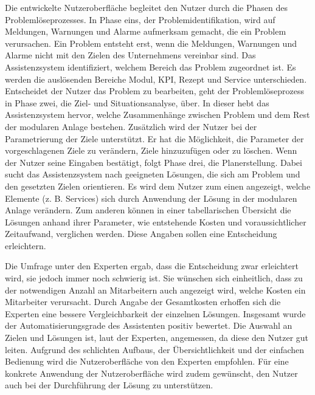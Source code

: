 Die entwickelte Nutzeroberfläche begleitet den Nutzer durch die Phasen des Problemlöseprozesses. In Phase eins, der Problemidentifikation, wird auf Meldungen, Warnungen und Alarme aufmerksam gemacht, die ein Problem verursachen. Ein Problem entsteht erst, wenn die Meldungen, Warnungen und Alarme nicht mit den Zielen des Unternehmens vereinbar sind. Das Assistenzsystem identifiziert, welchem Bereich das Problem zugeordnet ist. Es werden die auslösenden Bereiche Modul, KPI, Rezept und Service unterschieden. Entscheidet der Nutzer das Problem zu bearbeiten, geht der Problemlöseprozess in Phase zwei, die Ziel- und Situationsanalyse, über. In dieser hebt das Assistenzsystem hervor, welche Zusammenhänge zwischen Problem und dem Rest der modularen Anlage bestehen. Zusätzlich wird der Nutzer bei der Parametrierung der Ziele unterstützt. Er hat die Möglichkeit, die Parameter der vorgeschlagenen Ziele zu verändern, Ziele hinzuzufügen oder zu löschen. Wenn der Nutzer seine Eingaben bestätigt, folgt Phase drei, die Planerstellung. Dabei sucht das Assistenzsystem nach geeigneten Lösungen, die sich am Problem und den gesetzten Zielen orientieren. Es wird dem Nutzer zum einen angezeigt, welche Elemente (z. B. Services) sich durch Anwendung der Lösung in der modularen Anlage verändern. Zum anderen können in einer tabellarischen Übersicht die Lösungen anhand ihrer Parameter, wie entstehende Kosten und voraussichtlicher Zeitaufwand, verglichen werden. Diese Angaben sollen eine Entscheidung erleichtern.

Die Umfrage unter den Experten ergab, dass die Entscheidung zwar erleichtert wird, sie jedoch immer noch schwierig ist. Sie wünschen sich einheitlich, dass zu der notwendigen Anzahl an Mitarbeitern auch angezeigt wird, welche Kosten ein Mitarbeiter verursacht. Durch Angabe der Gesamtkosten erhoffen sich die Experten eine bessere Vergleichbarkeit der einzelnen Lösungen. Insgesamt wurde der Automatisierungsgrade des Assistenten positiv bewertet. Die Auswahl an Zielen und Lösungen ist, laut der Experten, angemessen, da diese den Nutzer gut leiten. Aufgrund des schlichten Aufbaus, der Übersichtlichkeit und der einfachen Bedienung wird die Nutzeroberfläche von den Experten empfohlen. Für eine konkrete Anwendung der Nutzeroberfläche wird zudem gewünscht, den Nutzer auch bei der Durchführung der Lösung zu unterstützen.

